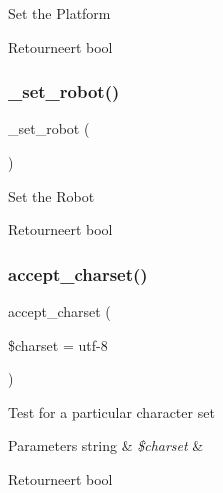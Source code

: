 Set the Platform

\begin{DoxyReturn}{Retourneert}
bool 
\end{DoxyReturn}
\mbox{\label{class_c_i___user__agent_a037f28a8a54578f57417d15fae820817}} 
\subsubsection{\texorpdfstring{\_set\_robot()}{\_set\_robot()}}
{\footnotesize\ttfamily \+\_\+set\+\_\+robot (\begin{DoxyParamCaption}{ }\end{DoxyParamCaption})\hspace{0.3cm}{\ttfamily [protected]}}

Set the Robot

\begin{DoxyReturn}{Retourneert}
bool 
\end{DoxyReturn}
\mbox{\label{class_c_i___user__agent_adc1f6218ec74ef1686ae6cb1218be7b1}} 
\subsubsection{\texorpdfstring{accept\_charset()}{accept\_charset()}}
{\footnotesize\ttfamily accept\+\_\+charset (\begin{DoxyParamCaption}\item[{}]{\$charset = {\ttfamily \textquotesingle{}utf-\/8\textquotesingle{}} }\end{DoxyParamCaption})}

Test for a particular character set


\begin{DoxyParams}[1]{Parameters}
string & {\em \$charset} & \\
\hline
\end{DoxyParams}
\begin{DoxyReturn}{Retourneert}
bool 
\end{DoxyReturn}
\mbox{\label{class_c_i___user__agent_a89add2e480d14b5f755993f4f5e0bd72}} 
